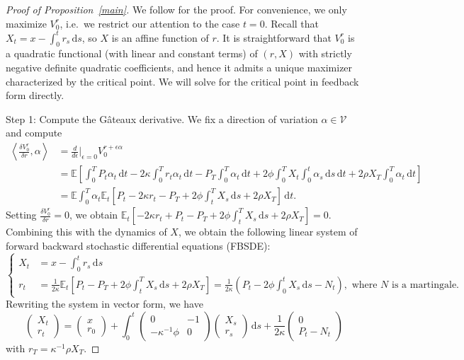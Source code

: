 \documentclass[openany,oneside]{article}
\theoremstyle{definition}
\theoremstyle{remark}
\newcommand{\E}{\mathbb{E}} %
\newcommand{\ts}{\textstyle}
\newcommand{\de}{\,\mathrm{d}}
\begin{document}
\begin{proof}[Proof of Proposition~\ref{main}]
We follow \cite{bouchard2017equilibrium} for the proof. For convenience, we only maximize $V^r_0$, i.e.\ we restrict our attention to the case $t=0$. Recall that $X_t = x-\int_0^t r_s \de s$, so $X$ is an affine function of $r$. It is straightforward that $V^r_0$ is a quadratic functional (with linear and constant terms) of $(r,X)$ with strictly negative definite quadratic coefficients, and hence it admits a unique maximizer characterized by the critical point. We will solve for the critical point in feedback form directly.

Step 1: Compute the G\^ateaux derivative. We fix a direction of variation $\alpha \in \mathcal{V}$ and compute
\begin{align*}
\ts\left\langle \frac{\delta V^r_0}{\delta r}, \alpha \right\rangle &\ts= \frac{d}{d\epsilon}\Big\vert_{\epsilon=0} V^{r+\epsilon\alpha}_0  \\
&\ts= \E\left[\int_0^T P_t \alpha_t \de t - 2\kappa\int_0^T r_t \alpha_t \de t - P_T \int_0^T \alpha_t \de t + 2\phi\int_0^T X_t \int_0^t \alpha_s \de s \de t + 2\rho X_T \int_0^T \alpha_t \de t \right] \\
&\ts= \E\int_0^T \alpha_t \E_t\left[P_t - 2\kappa r_t - P_T + 2\phi\int_t^T X_s \de s + 2\rho X_T \right] \de t.
\end{align*}
Setting $\frac{\delta V^r_0}{\delta r}=0$, we obtain $\E_t[-2\kappa r_t + P_t - P_T + 2\phi\int_t^T X_s \de s + 2\rho X_T ] = 0$. Combining this with the dynamics of $X$, we obtain the following linear system of forward backward stochastic differential equations (FBSDE):
\[
\begin{cases}
X_t &= x-\int_0^t r_s \de s \\
r_t &= \frac{1}{2\kappa}\E_t\left[P_t-P_T+2\phi\int_t^T X_s \de s + 2\rho X_T\right] = \frac{1}{2\kappa}\left(P_t-2\phi\int_0^t X_s \de s - N_t\right), \textrm{ where $N$ is a martingale.} 
\end{cases}
\]
Rewriting the system in vector form, we have
\[
\begin{pmatrix} X_t \\ r_t \end{pmatrix} = \begin{pmatrix} x \\ r_0 \end{pmatrix} + \int_0^t \begin{pmatrix} 0 & -1 \\ -\kappa^{-1}\phi & 0 \end{pmatrix} \begin{pmatrix} X_s \\ r_s \end{pmatrix} \de s + \frac{1}{2\kappa}\begin{pmatrix} 0 \\ P_t - N_t \end{pmatrix}
\]
with $r_T = \kappa^{-1}\rho X_T$.


\end{proof}
\end{document}
